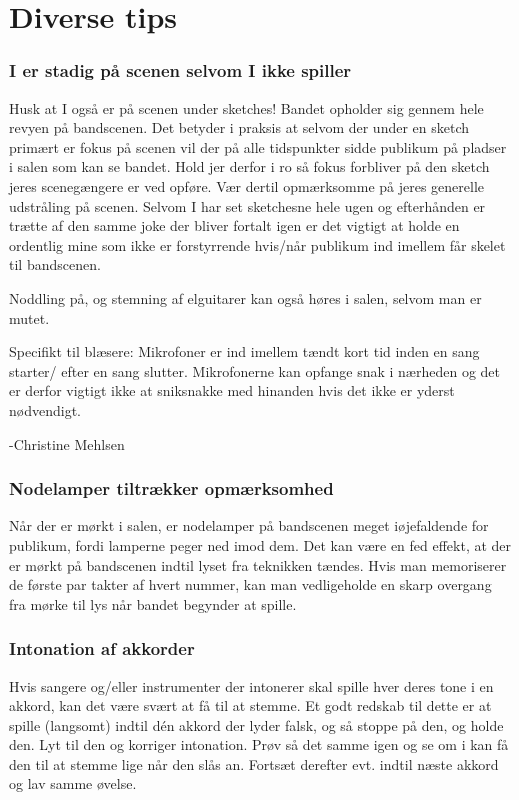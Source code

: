 \section{Diverse tips}
\subsubsection{I er stadig på scenen selvom I ikke spiller}
Husk at I også er på scenen under sketches!
Bandet opholder sig gennem hele revyen på bandscenen.
Det betyder i praksis at selvom der under en sketch primært er fokus på scenen vil der på alle tidspunkter sidde publikum på pladser i salen som kan se bandet.
Hold jer derfor i ro så fokus forbliver på den sketch jeres scenegængere er ved opføre.
Vær dertil opmærksomme på jeres generelle udstråling på scenen.
Selvom I har set sketchesne hele ugen og efterhånden er trætte af den samme joke der bliver fortalt igen er det vigtigt at holde en ordentlig mine som ikke er forstyrrende hvis/når publikum ind imellem får skelet til bandscenen.

Noddling på, og stemning af elguitarer kan også høres i salen, selvom man er mutet.

Specifikt til blæsere: Mikrofoner er ind imellem tændt kort tid inden en sang starter/ efter en sang slutter.
Mikrofonerne kan opfange snak i nærheden og det er derfor vigtigt ikke at sniksnakke med hinanden hvis det ikke er yderst nødvendigt.

-Christine Mehlsen

\subsubsection{Nodelamper tiltrækker opmærksomhed}
Når der er mørkt i salen, er nodelamper på bandscenen meget iøjefaldende for publikum, fordi lamperne peger ned imod dem. Det kan være en fed effekt, at der er mørkt på bandscenen indtil lyset fra teknikken tændes. Hvis man memoriserer de første par takter af hvert nummer, kan man vedligeholde en skarp overgang fra mørke til lys når bandet begynder at spille.

\subsubsection{Intonation af akkorder}
Hvis sangere og/eller instrumenter der intonerer skal spille hver deres tone i en akkord, kan det være svært at få til at stemme. Et godt redskab til dette er at spille (langsomt) indtil dén akkord der lyder falsk, og så stoppe på den, og holde den. Lyt til den og korriger intonation. Prøv så det samme igen og se om i kan få den til at stemme lige når den slås an. Fortsæt derefter evt. indtil næste akkord og lav samme øvelse.

